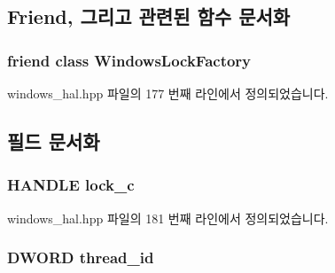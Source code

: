 \subsection{Friend, 그리고 관련된 함수 문서화}
\subsubsection[{\texorpdfstring{Windows\+Lock\+Factory}{WindowsLockFactory}}]{\setlength{\rightskip}{0pt plus 5cm}friend class {\bf Windows\+Lock\+Factory}\hspace{0.3cm}{\ttfamily [friend]}}\hypertarget{class_windows_lock_ae4d6fa718383d1635c927459e7cae312}{}\label{class_windows_lock_ae4d6fa718383d1635c927459e7cae312}


windows\+\_\+hal.\+hpp 파일의 177 번째 라인에서 정의되었습니다.



\subsection{필드 문서화}
\subsubsection[{\texorpdfstring{lock\+\_\+c}{lock_c}}]{\setlength{\rightskip}{0pt plus 5cm}H\+A\+N\+D\+LE lock\+\_\+c\hspace{0.3cm}{\ttfamily [private]}}\hypertarget{class_windows_lock_a189177b16339d38605048558fe2ca473}{}\label{class_windows_lock_a189177b16339d38605048558fe2ca473}


windows\+\_\+hal.\+hpp 파일의 181 번째 라인에서 정의되었습니다.

\subsubsection[{\texorpdfstring{thread\+\_\+id}{thread_id}}]{\setlength{\rightskip}{0pt plus 5cm}D\+W\+O\+RD thread\+\_\+id\hspace{0.3cm}{\ttfamily [private]}}\hypertarget{class_windows_lock_afb0cb0dfb6676a8802089b63ae981f37}{}\label{class_windows_lock_afb0cb0dfb6676a8802089b63ae981f37}


